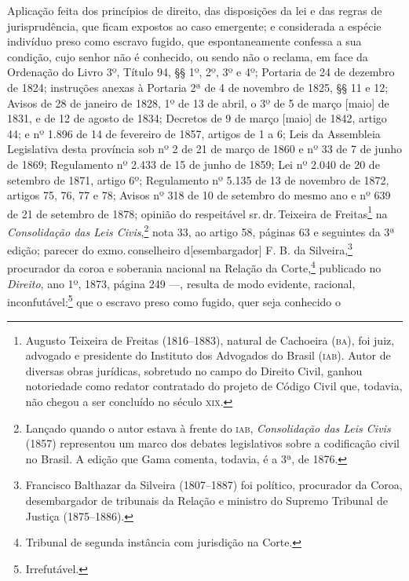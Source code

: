 Aplicação feita dos princípios de direito, das disposições da lei e das
regras de jurisprudência, que ficam expostos ao caso emergente; e
considerada a espécie indivíduo preso como escravo fugido, que
espontaneamente confessa a sua condição, cujo senhor não é conhecido, ou
sendo não o reclama, em face da Ordenação do Livro 3º, Título 94, §§ 1º,
2º, 3º e 4º; Portaria de 24 de dezembro de 1824; instruções anexas à
Portaria 2ª de 4 de novembro de 1825, §§ 11 e 12; Avisos de 28 de
janeiro de 1828, 1º de 13 de abril, o 3º de 5 de março {[}maio{]} de
1831, e de 12 de agosto de 1834; Decretos de 9 de março {[}maio{]} de
1842, artigo 44; e nº 1.896 de 14 de fevereiro de 1857, artigos de
1 a 6; Leis da Assembleia Legislativa desta província sob nº 2 de 21 de
março de 1860 e nº 33 de 7 de junho de 1869; Regulamento nº 2.433 de 15
de junho de 1859; Lei nº 2.040 de 20 de setembro de 1871, artigo 6º;
Regulamento nº 5.135 de 13 de novembro de 1872, artigos 75, 76, 77 e 78;
Avisos nº 318 de 10 de setembro do mesmo ano e nº 639 de 21 de setembro
de 1878; opinião do respeitável sr.\,dr.\,Teixeira de Freitas\footnote{
  Augusto Teixeira de Freitas (1816--1883), natural de Cachoeira (\textsc{ba}),
  foi juiz, advogado e presidente do Instituto dos Advogados do Brasil
  (\textsc{iab}). Autor de diversas obras jurídicas, sobretudo no campo do
  Direito Civil, ganhou notoriedade como redator contratado do projeto
  de Código Civil que, todavia, não chegou a ser concluído no século \textsc{xix}.}
na \emph{Consolidação das Leis Civis},\footnote{Lançado quando o autor
  estava à frente do \textsc{iab},
  \emph{Consolidação das Leis Civis} (1857) representou um marco dos
  debates legislativos sobre a codificação civil no Brasil. A edição que
  Gama comenta, todavia, é a 3ª, de 1876.} nota 33, ao artigo
58, páginas 63 e seguintes da 3ª edição; parecer do exmo.\,conselheiro
d{[}esembargador{]} F. B. da Silveira,\footnote{Francisco Balthazar \label{balthazar}
  da Silveira (1807--1887) foi político, procurador da Coroa,
  desembargador de tribunais da Relação e ministro do Supremo Tribunal de Justiça (1875--1886).} procurador da coroa e soberania nacional na
Relação da Corte,\footnote{Tribunal de segunda instância com jurisdição
  na Corte.} publicado no \emph{Direito}, ano 1º, 1873, página 249
---, resulta de modo evidente, racional, inconfutável:\footnote{
  Irrefutável.} que o escravo preso como fugido, quer seja conhecido o
